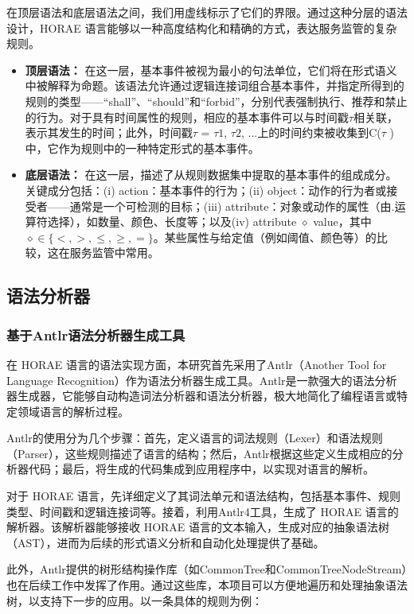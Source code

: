 在顶层语法和底层语法之间，我们用虚线标示了它们的界限。通过这种分层的语法设计，HORAE 语言能够以一种高度结构化和精确的方式，表达服务监管的复杂规则。



\begin{itemize}
    \item \textbf{顶层语法：} 在这一层，基本事件被视为最小的句法单位，它们将在形式语义中被解释为命题。该语法允许通过逻辑连接词组合基本事件，并指定所得到的规则的类型——“shall”、“should”和“forbid”，分别代表强制执行、推荐和禁止的行为。对于具有时间属性的规则，相应的基本事件可以与时间戳$\tau$相关联，表示其发生的时间；此外，时间戳$\tau$ = {$\tau1$, $\tau2$, ...}上的时间约束被收集到C($\tau$ )中，它作为规则中的一种特定形式的基本事件。
    \item \textbf{底层语法：} 在这一层，描述了从规则数据集中提取的基本事件的组成成分。关键成分包括：(i) action：基本事件的行为；(ii) object：动作的行为者或接受者——通常是一个可检测的目标；(iii) attribute：对象或动作的属性（由.运算符选择），如数量、颜色、长度等；以及(iv) attribute $\diamond$ value，其中$\diamond \in \{<, >, \leq, \geq, =\}$。某些属性与给定值（例如阈值、颜色等）的比较，这在服务监管中常用。
\end{itemize}

\subsection{语法分析器}

\subsubsection{基于Antlr语法分析器生成工具}

在 HORAE 语言的语法实现方面，本研究首先采用了Antlr（Another Tool for Language Recognition）作为语法分析器生成工具。Antlr是一款强大的语法分析器生成器，它能够自动构造词法分析器和语法分析器，极大地简化了编程语言或特定领域语言的解析过程。

Antlr的使用分为几个步骤：首先，定义语言的词法规则（Lexer）和语法规则（Parser），这些规则描述了语言的结构；然后，Antlr根据这些定义生成相应的分析器代码；最后，将生成的代码集成到应用程序中，以实现对语言的解析。

对于 HORAE 语言，先详细定义了其词法单元和语法结构，包括基本事件、规则类型、时间戳和逻辑连接词等。接着，利用Antlr4工具，生成了 HORAE 语言的解析器。该解析器能够接收 HORAE 语言的文本输入，生成对应的抽象语法树（AST），进而为后续的形式语义分析和自动化处理提供了基础。

此外，Antlr提供的树形结构操作库（如CommonTree和CommonTreeNodeStream）也在后续工作中发挥了作用。通过这些库，本项目可以方便地遍历和处理抽象语法树，以支持下一步的应用。以一条具体的规则为例：

